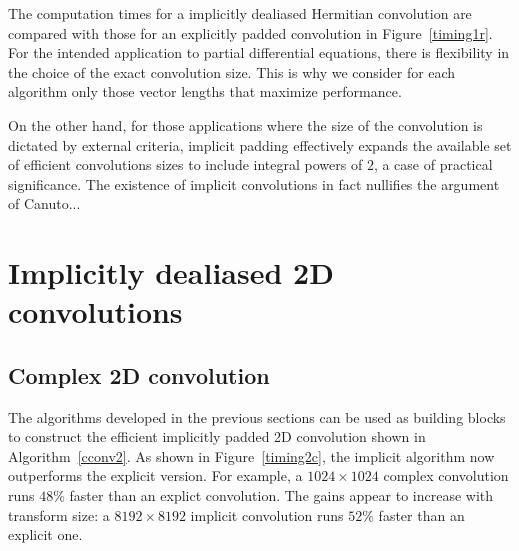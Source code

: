 \documentclass[final]{siamltex}
\def\be{\begin{dmath*}}
\def\ee{\end{dmath*}}
\def\bel{\begin{dmath}}
\def\eel{\end{dmath}}
\def\no{\hiderel}
\begin{document}

The computation times for a implicitly dealiased Hermitian
convolution are compared with those for an explicitly padded convolution in
Figure~\ref{timing1r}. For the intended application to partial differential
equations, there is flexibility in the choice of the exact convolution
size. This is why we consider for each algorithm only those vector lengths
that maximize performance.

On the other hand, for those applications where the size of the convolution
is dictated by external criteria, implicit padding effectively expands the
available set of efficient convolutions sizes to include integral powers of
$2$, a case of practical significance. The existence of implicit convolutions in
fact nullifies the argument of Canuto...

\section{Implicitly dealiased 2D convolutions}\label{2d}

\subsection{Complex 2D convolution}
The algorithms developed in the previous sections can be used as building
blocks to construct the efficient implicitly padded 2D convolution shown in
Algorithm~\ref{cconv2}. As shown in Figure~\ref{timing2c}, the implicit
algorithm now outperforms the explicit version. 
For example, a $1024\times 1024$ complex convolution runs $48\%$ faster
than an explict convolution. The gains appear to increase with transform
size: a $8192\times 8192$ implicit convolution runs $52\%$ faster than an
explicit one.
\end{document}
